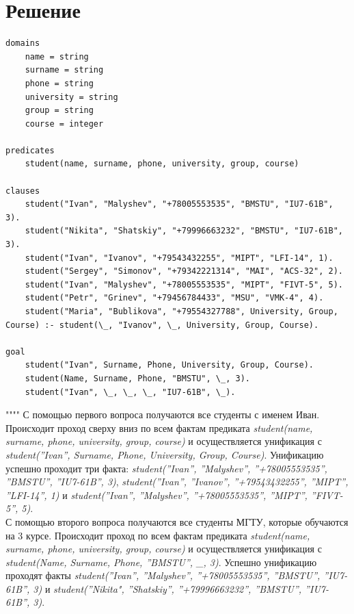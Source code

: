 \documentclass[12pt]{report}
\begin{document}
\section*{Решение}
\begin{lstlisting}
domains
	name = string
	surname = string
	phone = string
	university = string
	group = string
	course = integer

predicates
	student(name, surname, phone, university, group, course)

clauses
	student("Ivan", "Malyshev", "+78005553535", "BMSTU", "IU7-61B", 3).
	student("Nikita", "Shatskiy", "+79996663232", "BMSTU", "IU7-61B", 3).
	student("Ivan", "Ivanov", "+79543432255", "MIPT", "LFI-14", 1).
	student("Sergey", "Simonov", "+79342221314", "MAI", "ACS-32", 2).
	student("Ivan", "Malyshev", "+78005553535", "MIPT", "FIVT-5", 5).
	student("Petr", "Grinev", "+79456784433", "MSU", "VMK-4", 4).
	student("Maria", "Bublikova", "+79554327788", University, Group, Course) :- student(\_, "Ivanov", \_, University, Group, Course).

goal
	student("Ivan", Surname, Phone, University, Group, Course).
	student(Name, Surname, Phone, "BMSTU", \_, 3).
	student("Ivan", \_, \_, \_, "IU7-61B", \_).
\end{lstlisting}

""\newline""\newline\indent
С помощью первого вопроса получаются все студенты с именем Иван. Происходит проход сверху вниз по всем фактам предиката \emph{student(name, surname, phone, university, group, course)} и осуществляется унификация с \emph{student(''Ivan'', Surname, Phone, University, Group, Course)}. Унификацию успешно проходит три факта: \emph{student(''Ivan'', ''Malyshev'', ''+78005553535'', ''BMSTU'', ''IU7-61B'', 3)}, \emph{student(''Ivan'', ''Ivanov'', ''+79543432255'', ''MIPT'', ''LFI-14'', 1)} и \emph{student(''Ivan'', ''Malyshev'', ''+78005553535'', ''MIPT'', ''FIVT-5'', 5)}.\\

С помощью второго вопроса получаются все студенты МГТУ, которые обучаются на 3 курсе.  Происходит проход по всем фактам предиката \emph{student(name, surname, phone, university, group, course)} и осуществляется унификация с \emph{student(Name, Surname, Phone, ''BMSTU'', \_, 3)}.  Успешно унификацию проходят факты \emph{student(''Ivan'', ''Malyshev'', ''+78005553535'', ''BMSTU'', ''IU7-61B'', 3)} и \emph{student(''Nikita", ''Shatskiy'', ''+79996663232'', ''BMSTU'', ''IU7-61B'', 3)}.\\
\end{document}
